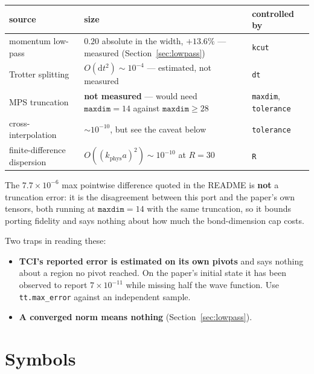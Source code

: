\documentclass[11pt,a4paper]{article}
\newcommand{\code}[1]{\texttt{#1}}
\newcommand{\kph}{k_{\mathrm{phys}}}
\newcommand{\dd}{\mathrm{d}}
\begin{document}
\begin{center}
\begin{tabularx}{\textwidth}{@{}lLl@{}}
\toprule
source & size & controlled by \\
\midrule
momentum low-pass & $0.20$ absolute in the width, $+13.6\%$ --- measured
  (Section~\ref{sec:lowpass}) & \code{kcut} \\
\addlinespace
Trotter splitting & $O(\dd t^2) \sim 10^{-4}$ --- estimated, not measured & \code{dt} \\
\addlinespace
MPS truncation & \textbf{not measured} --- would need $\code{maxdim} = 14$ against
  $\code{maxdim} \geq 28$ & \code{maxdim}, \code{tolerance} \\
\addlinespace
cross-interpolation & ${\sim}10^{-10}$, but see the caveat below & \code{tolerance} \\
\addlinespace
finite-difference dispersion & $O\!\left((\kph a)^2\right) \sim 10^{-10}$ at $R = 30$
  & \code{R} \\
\bottomrule
\end{tabularx}
\end{center}

The $7.7\times10^{-6}$ max pointwise difference quoted in the README is \textbf{not} a
truncation error: it is the disagreement between this port and the paper's own
tensors, both running at $\code{maxdim} = 14$ with the same truncation, so it bounds
porting fidelity and says nothing about how much the bond-dimension cap costs.

Two traps in reading these:

\begin{itemize}[leftmargin=1.2em]
\item \textbf{TCI's reported error is estimated on its own pivots} and says nothing
  about a region no pivot reached. On the paper's initial state it has been observed
  to report $7\times10^{-11}$ while missing half the wave function. Use
  \code{tt.max\_error} against an independent sample.
\item \textbf{A converged norm means nothing} (Section~\ref{sec:lowpass}).
\end{itemize}

\section{Symbols}
\end{document}
